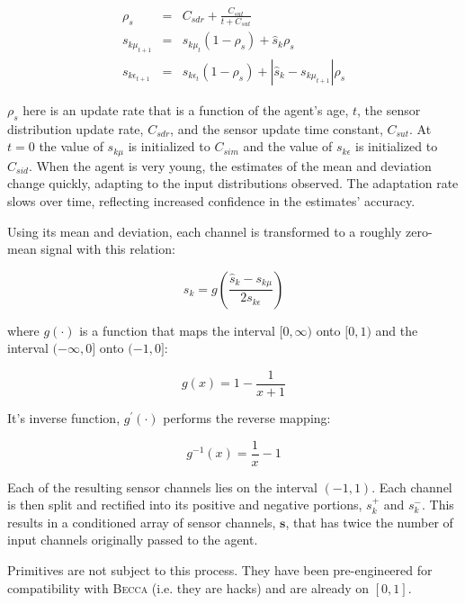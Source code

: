 \begin{eqnarray}
\rho_s &=& C_{sdr} + \frac{C_{sut}}{ t + C_{sut}}\\
s_{k \mu_{t+1}} &=& s_{k \mu_t } (1 - \rho_s)  + \hat{s}_k  \rho_s \\
s_{k \epsilon_{t+1}} &=& s_{k \epsilon_t}  (1 - \rho_s)  + |\hat{s}_k - s_{k \mu_{t+1}}| \rho_s 
\end{eqnarray}

$\rho_s$ here is an update rate that is a function of the agent's age, $t$, the sensor distribution update rate, $C_{sdr}$, and the sensor update time constant, $C_{sut}$. At $t=0$ the value of $s_{k \mu}$ is initialized to $C_{sim}$ and the value of $s_{k \epsilon}$ is initialized to $C_{sid}$. When the agent is very young, the estimates of the mean and deviation change quickly, adapting to the input distributions observed. The adaptation rate slows over time, reflecting increased confidence in the estimates' accuracy.

Using its mean and deviation, each channel is transformed to a roughly zero-mean signal with this relation:

\begin{equation}
s_k = g \left (\frac{\hat{s}_k - s_{k \mu} }{2 s_{k \epsilon}} \right )
\end{equation}

where $g(\cdot)$ is a function that maps the interval $[0, \infty)$ onto $[0,1)$ and the interval $(-\infty,0]$ onto $(-1,0]$:

\begin{equation}
g(x) = 1 - \frac{1}{x + 1} 
\label{inf_to_one_map}
\end{equation}

It's inverse function, $g^\prime(\cdot)$ performs the reverse mapping:

\begin{equation}
g^{-1}(x) = \frac{1}{x} - 1
\label{one_to_inf_map}
\end{equation}

Each of the resulting sensor channels lies on the interval $(-1,1)$. Each channel is then split and rectified into its positive and negative portions, $s_k^+$ and $s_k^-$. This results in a conditioned array of sensor channels, $\mathbf{s}$, that has twice the number of input channels originally passed to the agent.

Primitives are not subject to this process. They have been pre-engineered for compatibility with \textsc{Becca} (i.e. they are hacks) and are already on $[0, 1]$.

